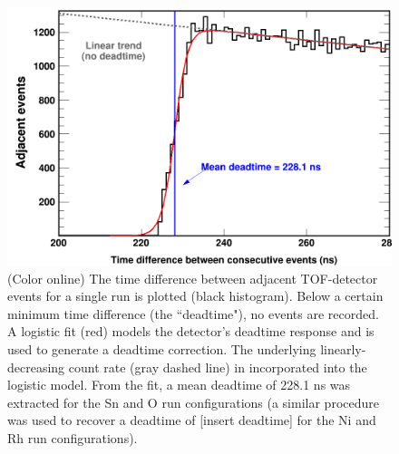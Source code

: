 \documentclass[twocolumn,secnumarabic,amssymb, nobibnotes, aps, prl,
superscriptaddress, nobalancelastpage]{revtex4}
\begin{document}
\begin{figure}
    \includegraphics[scale=0.24]{figures/TimeDifferenceBetweenEvents.png}
    \caption{(Color online) The time difference between adjacent TOF-detector
    events for a single run is plotted (black histogram). Below a certain
minimum time difference (the ``deadtime"), no events are recorded. A logistic
fit (red) models the detector's deadtime response and is used to generate a
deadtime correction. The underlying linearly-decreasing count rate (gray dashed
line) in incorporated into the logistic model. From the fit, a mean deadtime of
228.1 ns was extracted for the Sn and O run configurations (a similar
procedure was used to recover a deadtime of [insert deadtime] for the Ni and Rh
run configurations).}
    \label{TimeDifferenceBetweenEvents}
\end{figure}
\end{document}
